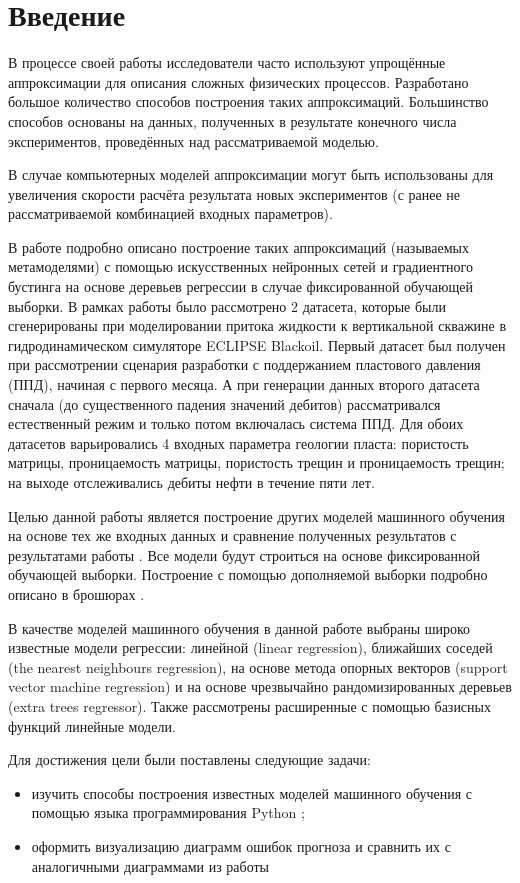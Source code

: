 \chapter*{Введение} %

В процессе своей работы исследователи часто используют упрощённые аппроксимации для описания сложных физических процессов. Разработано большое количество способов построения таких аппроксимаций.
Большинство способов основаны на данных, полученных в результате конечного числа экспериментов, проведённых над рассматриваемой моделью.

В случае компьютерных моделей аппроксимации могут быть использованы для увеличения скорости расчёта результата новых экспериментов (с ранее не рассматриваемой комбинацией входных параметров).

В работе \cite{muravtsev:metamodel} подробно описано построение таких аппроксимаций (называемых метамоделями) с помощью искусственных нейронных сетей и градиентного бустинга на основе деревьев регрессии в случае фиксированной обучающей выборки.
В рамках работы \cite{muravtsev:metamodel} было рассмотрено 2 датасета, которые были сгенерированы при моделировании притока жидкости к вертикальной скважине в гидродинамическом симуляторе ECLIPSE Blackoil. Первый датасет был получен при рассмотрении сценария разработки с поддержанием пластового давления (ППД), начиная с первого месяца. А при генерации данных второго датасета сначала (до существенного падения значений дебитов) рассматривался естественный режим и только потом включалась система ППД. Для обоих датасетов варьировались 4 входных параметра геологии пласта: пористость матрицы, проницаемость матрицы, пористость трещин и проницаемость трещин; на выходе отслеживались дебиты нефти в течение пяти лет.

Целью данной работы является построение других моделей машинного обучения на основе тех же входных данных и сравнение полученных результатов с результатами работы \cite{muravtsev:metamodel}. Все модели будут строиться на основе фиксированной обучающей выборки. Построение с помощью дополняемой выборки подробно описано в брошюрах \cite{surr_model, surr_model2}.

В качестве моделей машинного обучения в данной работе выбраны широко известные модели регрессии: линейной (linear regression), ближайших соседей (the nearest neighbours regression), на основе метода опорных векторов (support vector machine regression) и на основе чрезвычайно рандомизированных деревьев (extra trees regressor). Также рассмотрены расширенные с помощью базисных функций линейные модели.

Для достижения цели были поставлены следующие задачи:
\begin{itemize}
	\item изучить способы построения известных моделей машинного обучения с помощью языка программирования Python \cite{brownlee_alg, sklearn_doc};
	\item оформить визуализацию диаграмм ошибок прогноза и сравнить их с аналогичными диаграммами из работы \cite{muravtsev:metamodel}
\end{itemize}

